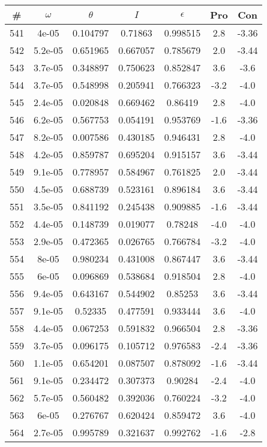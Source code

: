 \begin{table}
\begin{tabular}{c|c|c|c|c|c|c}
\# & $\omega$ & $\theta$ & $I$ & $\epsilon$ & Pro & Con\\
\hline
541 & 4e-05 & 0.104797 & 0.71863 & 0.998515 & 2.8 & -3.36\\
542 & 5.2e-05 & 0.651965 & 0.667057 & 0.785679 & 2.0 & -3.44\\
543 & 3.7e-05 & 0.348897 & 0.750623 & 0.852847 & 3.6 & -3.6\\
544 & 3.7e-05 & 0.548998 & 0.205941 & 0.766323 & -3.2 & -4.0\\
545 & 2.4e-05 & 0.020848 & 0.669462 & 0.86419 & 2.8 & -4.0\\
546 & 6.2e-05 & 0.567753 & 0.054191 & 0.953769 & -1.6 & -3.36\\
547 & 8.2e-05 & 0.007586 & 0.430185 & 0.946431 & 2.8 & -4.0\\
548 & 4.2e-05 & 0.859787 & 0.695204 & 0.915157 & 3.6 & -3.44\\
549 & 9.1e-05 & 0.778957 & 0.584967 & 0.761825 & 2.0 & -3.44\\
550 & 4.5e-05 & 0.688739 & 0.523161 & 0.896184 & 3.6 & -3.44\\
551 & 3.5e-05 & 0.841192 & 0.245438 & 0.909885 & -1.6 & -3.44\\
552 & 4.4e-05 & 0.148739 & 0.019077 & 0.78248 & -4.0 & -4.0\\
553 & 2.9e-05 & 0.472365 & 0.026765 & 0.766784 & -3.2 & -4.0\\
554 & 8e-05 & 0.980234 & 0.431008 & 0.867447 & 3.6 & -3.44\\
555 & 6e-05 & 0.096869 & 0.538684 & 0.918504 & 2.8 & -4.0\\
556 & 9.4e-05 & 0.643167 & 0.544902 & 0.85253 & 3.6 & -3.44\\
557 & 9.1e-05 & 0.52335 & 0.477591 & 0.933444 & 3.6 & -4.0\\
558 & 4.4e-05 & 0.067253 & 0.591832 & 0.966504 & 2.8 & -3.36\\
559 & 3.7e-05 & 0.096175 & 0.105712 & 0.976583 & -2.4 & -3.36\\
560 & 1.1e-05 & 0.654201 & 0.087507 & 0.878092 & -1.6 & -3.44\\
561 & 9.1e-05 & 0.234472 & 0.307373 & 0.90284 & -2.4 & -4.0\\
562 & 5.7e-05 & 0.560482 & 0.392036 & 0.760224 & -3.2 & -4.0\\
563 & 6e-05 & 0.276767 & 0.620424 & 0.859472 & 3.6 & -4.0\\
564 & 2.7e-05 & 0.995789 & 0.321637 & 0.992762 & -1.6 & -2.8\\

\end{tabular}
\end{table}
